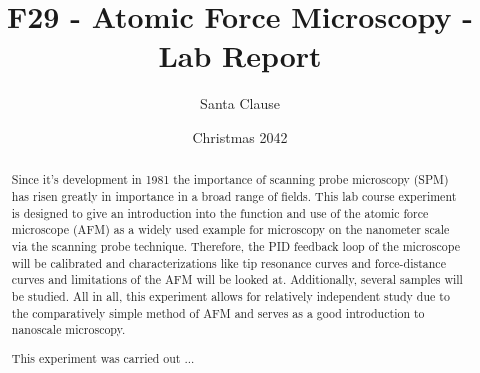 \documentclass[12pt]{article}
\title{F29 - Atomic Force Microscopy - Lab Report}
\author{Santa Clause}
\date{Christmas 2042}
\begin{document}
\maketitle

\begin{abstract}
Since it's development in 1981 the importance of scanning probe microscopy (SPM) has risen greatly in importance in a broad range of fields.
This lab course experiment is designed to give an introduction into the function and use of the atomic force microscope (AFM) as a widely used example for microscopy on the nanometer scale via the scanning probe technique. Therefore, the PID feedback loop of the microscope will be calibrated and characterizations like tip resonance curves and force-distance curves and limitations of the AFM will be looked at. Additionally, several samples will be studied. All in all, this experiment allows for relatively independent study due to the comparatively simple method of AFM and serves as a good introduction to nanoscale microscopy. 

This experiment was carried out ... \\
\end{abstract}


\begin{multicols}{2}

%




\end{multicols}
\end{document}
